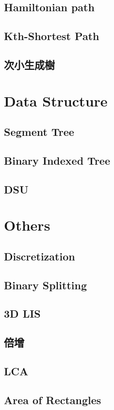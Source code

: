\documentclass[a4paper,10pt,twocolumn,oneside]{article}
\begin{document}
\subsection{Hamiltonian path}


\subsection{Kth-Shortest Path}


\subsection{次小生成樹}


\section{Data Structure}
\subsection{Segment Tree}


\subsection{Binary Indexed Tree}


\subsection{DSU}


\section{Others}
\subsection{Discretization}


\subsection{Binary Splitting}


\subsection{3D LIS}


\subsection{倍增}


\subsection{LCA}


\subsection{Area of Rectangles}

\end{document}
